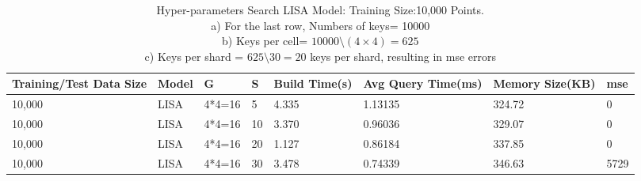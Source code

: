 \begin{table}
	\centering
	\begin{tabular}{||p{}<{\centering}|p{}<{\centering}|p{}<{\centering}| p{}<{\centering}|p{}<{\centering}|p{}<{\centering}|p{}<{\centering}|p{}<{\centering}||}
		\hline
		Training/Test Data Size& Model & G & S& Build Time(s) & Avg Query Time(ms) & Memory Size(KB) &mse\\ [0.5ex] 
		\hline
		\hline
		10,000& LISA& 4*4=16 & 5& 4.335& 1.13135 & 324.72&0\\
		\hline
		10,000& LISA& 4*4=16 & 10& 3.370& 0.96036 & 329.07&0\\
		\hline
		10,000& LISA& 4*4=16 & 20&1.127& 0.86184 & 337.85&0\\
		\hline
		10,000& LISA& 4*4=16 & 30&3.478& 0.74339 & 346.63&5729\\
		\hline
	    \hline
	\end{tabular}

    \caption{Hyper-parameters Search LISA Model: Training Size:10,000 Points. \\
    a) For the last row, Numbers of keys= 10000 \\
    b) Keys per cell= $10000 \setminus (4\times4) = 625$\\
    c) Keys per shard = $625\setminus30=20$ keys per shard, resulting in mse errors}
	\label{small_lognormal_lisa_10000}
\end{table}

